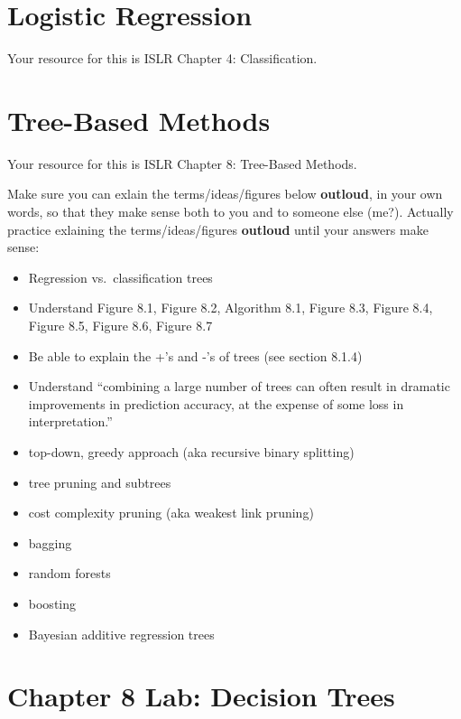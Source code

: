 \documentclass[
]{book}
\providecommand{\tightlist}{%
  \setlength{\itemsep}{0pt}\setlength{\parskip}{0pt}}
\begin{document}
\hypertarget{logistic-regression}{%
\chapter{Logistic Regression}\label{logistic-regression}}

Your resource for this is ISLR Chapter 4: Classification.

\hypertarget{tree-based-methods}{%
\chapter{Tree-Based Methods}\label{tree-based-methods}}

Your resource for this is ISLR Chapter 8: Tree-Based Methods.

Make sure you can exlain the terms/ideas/figures below \textbf{outloud}, in your own words, so that they make sense both to you and to someone else (me?). Actually practice exlaining the terms/ideas/figures \textbf{outloud} until your answers make sense:

\begin{itemize}
\tightlist
\item
  Regression vs.~classification trees
\item
  Understand Figure 8.1, Figure 8.2, Algorithm 8.1, Figure 8.3, Figure 8.4, Figure 8.5, Figure 8.6, Figure 8.7
\item
  Be able to explain the +'s and -'s of trees (see section 8.1.4)
\item
  Understand ``combining a large number of trees
  can often result in dramatic improvements in prediction accuracy, at the expense of some loss in interpretation.''
\item
  top-down, greedy approach (aka recursive binary splitting)
\item
  tree pruning and subtrees
\item
  cost complexity pruning (aka weakest link pruning)
\item
  bagging
\item
  random forests
\item
  boosting
\item
  Bayesian additive regression trees
\end{itemize}

\hypertarget{chapter-8-lab-decision-trees}{%
\chapter{Chapter 8 Lab: Decision Trees}\label{chapter-8-lab-decision-trees}}
\end{document}

